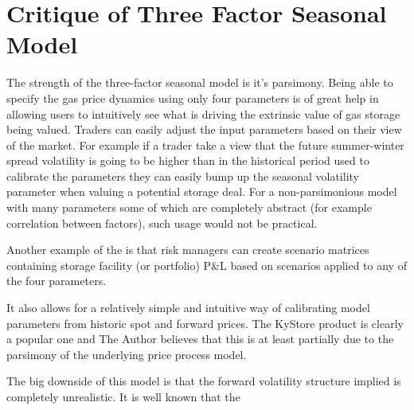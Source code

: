 \documentclass{article}
\begin{document}
\section{Critique of Three Factor Seasonal Model}
The strength of the three-factor seasonal model is it's parsimony. 
Being able to specify the gas price dynamics using only four parameters is of great help
in allowing users to intuitively see what is driving the extrinsic value of gas storage
being valued. Traders can easily adjust the input
parameters based on their view of the market. For example if a trader take a view that 
the future summer-winter spread volatility is going to be higher than in the historical
period used to calibrate the parameters they can easily bump up the seasonal volatility
parameter when valuing a potential storage deal. For a non-parsimonious model with many parameters
some of which are completely abstract (for example correlation between factors), such
usage would not be practical.

Another example of the is that risk managers can 
create scenario matrices containing storage facility (or portfolio) P\&L based on scenarios 
applied to any of the four parameters. 


It also allows for a relatively simple and intuitive way of calibrating
model parameters from historic spot and forward prices.
The KyStore product is clearly a popular one and The Author believes that this is at least partially due 
to the parsimony of the underlying price process model.

\bigskip
The big downside of this model is that the forward volatility structure implied is completely unrealistic.
It is well known that the 




\end{document}
